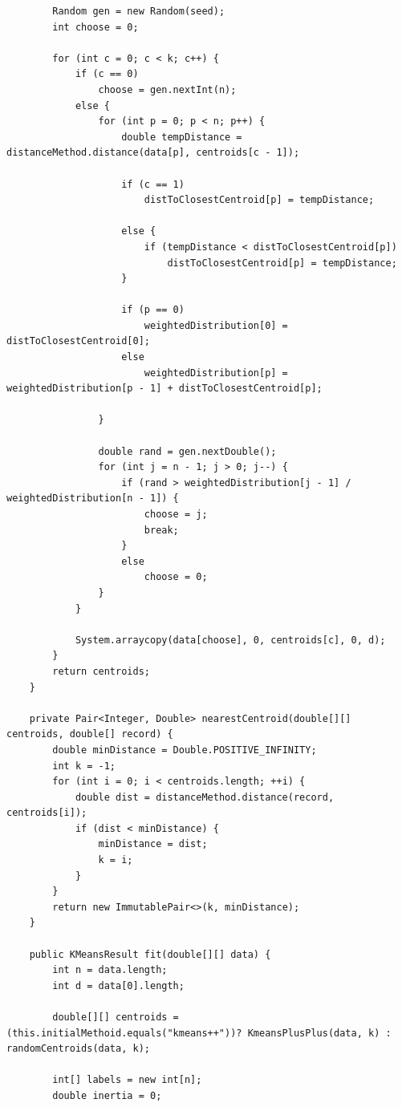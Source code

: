 \documentclass[]{final_report}
\begin{document}
\begin{verbatim}
        Random gen = new Random(seed);
        int choose = 0;

        for (int c = 0; c < k; c++) {
            if (c == 0)
                choose = gen.nextInt(n);
            else {
                for (int p = 0; p < n; p++) {
                    double tempDistance = distanceMethod.distance(data[p], centroids[c - 1]);

                    if (c == 1)
                        distToClosestCentroid[p] = tempDistance;

                    else {
                        if (tempDistance < distToClosestCentroid[p])
                            distToClosestCentroid[p] = tempDistance;
                    }

                    if (p == 0)
                        weightedDistribution[0] = distToClosestCentroid[0];
                    else
                        weightedDistribution[p] = weightedDistribution[p - 1] + distToClosestCentroid[p];

                }

                double rand = gen.nextDouble();
                for (int j = n - 1; j > 0; j--) {
                    if (rand > weightedDistribution[j - 1] / weightedDistribution[n - 1]) {
                        choose = j;
                        break;
                    }
                    else
                        choose = 0;
                }
            }

            System.arraycopy(data[choose], 0, centroids[c], 0, d);
        }
        return centroids;
    }

    private Pair<Integer, Double> nearestCentroid(double[][] centroids, double[] record) {
        double minDistance = Double.POSITIVE_INFINITY;
        int k = -1;
        for (int i = 0; i < centroids.length; ++i) {
            double dist = distanceMethod.distance(record, centroids[i]);
            if (dist < minDistance) {
                minDistance = dist;
                k = i;
            }
        }
        return new ImmutablePair<>(k, minDistance);
    }

    public KMeansResult fit(double[][] data) {
        int n = data.length;
        int d = data[0].length;

        double[][] centroids = (this.initialMethoid.equals("kmeans++"))? KmeansPlusPlus(data, k) : randomCentroids(data, k);

        int[] labels = new int[n];
        double inertia = 0;


\end{verbatim}
\end{document}
